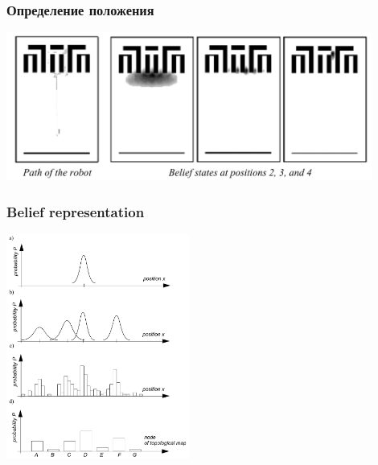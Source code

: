 \documentclass{../../slides-style}
\begin{document}
    \begin{frame}
        \frametitle{Определение положения}
        \begin{center}
            \includegraphics[width=0.9\textwidth]{uncertainity.png}
        \end{center}
    \end{frame}

    \begin{frame}
        \frametitle{Belief representation}
        \begin{center}
            \includegraphics[width=0.45\textwidth]{beliefRepresentation.png}
        \end{center}
    \end{frame}
\end{document}
